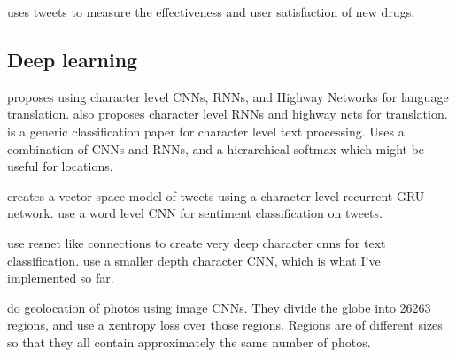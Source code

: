 \documentclass{article}
\begin{document}
\citet{wiley2014pharmaceutical} uses tweets to measure the effectiveness and user satisfaction of new drugs.


\subsection{Deep learning}

\citet{kim2016character} proposes using character level CNNs, RNNs, and Highway Networks for language translation.
\citet{chung2016character} also proposes character level RNNs and highway nets for translation.
\citet{jozefowicz2016exploring} is a generic classification paper for character level text processing.  
Uses a combination of CNNs and RNNs, and a hierarchical softmax which might be useful for locations.

\citet{dhingra2016tweet2vec} creates a vector space model of tweets using a character level recurrent GRU network.
\citet{severyn2015unitn} use a word level CNN for sentiment classification on tweets.

\citet{conneau2017very} use resnet like connections to create very deep character cnns for text classification.
\citet{zhang2015character} use a smaller depth character CNN, which is what I've implemented so far.

\citet{weyand2016planet} do geolocation of photos using image CNNs.
They divide the globe into 26263 regions, and use a xentropy loss over those regions.
Regions are of different sizes so that they all contain approximately the same number of photos.

\end{document}
